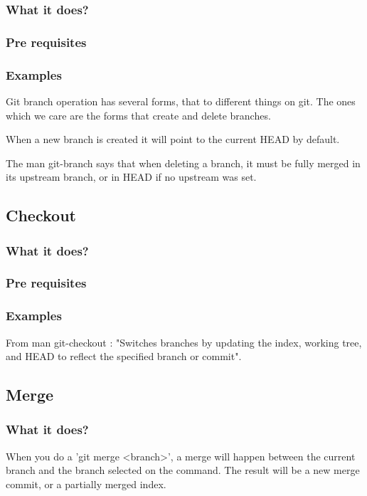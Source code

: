 \subsubsection{What it does?}
\subsubsection{Pre requisites}
\subsubsection{Examples}
Git branch operation has several forms, that to different things on git.
The ones which we care are the forms that create and delete branches. \par
When a new branch is created it will point to the current HEAD by default.
\par


The man git-branch says that when deleting a branch, it must be fully
merged in its upstream branch, or in HEAD if no upstream was set. \par


\subsection{Checkout}

\subsubsection{What it does?}
\subsubsection{Pre requisites}
\subsubsection{Examples}
From man git-checkout : "Switches branches by updating the index, 
working tree, and HEAD to reflect the specified branch or commit". \par

\subsection{Merge}

\subsubsection{What it does?}

When you do a 'git merge <branch>', a merge will happen between the current
branch and the branch selected on the command. The result will be a new merge 
commit, or a partially merged index. \par

